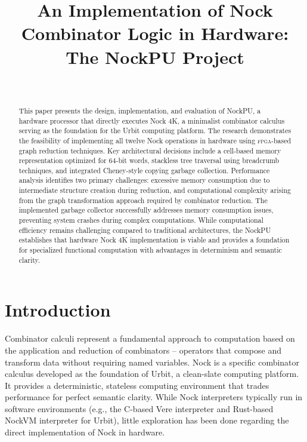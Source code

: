 \documentclass[twoside]{article}
\title{An Implementation of Nock Combinator Logic in Hardware: The NockPU Project}
\author{\authorpatp \\ \affiliation}
\date{}
\begin{document}
\maketitle
\thispagestyle{firststyle}

\begin{abstract}
\sloppy
This paper presents the design, implementation, and evaluation of NockPU, a hardware processor that directly executes Nock 4K, a minimalist combinator calculus serving as the foundation for the Urbit computing platform. The research demonstrates the feasibility of implementing all twelve Nock operations in hardware using \textsc{fpga}-based graph reduction techniques. Key architectural decisions include a cell-based memory representation optimized for 64-bit words, stackless tree traversal using breadcrumb techniques, and integrated Cheney-style copying garbage collection. Performance analysis identifies two primary challenges: excessive memory consumption due to intermediate structure creation during reduction, and computational complexity arising from the graph transformation approach required by combinator reduction. The implemented garbage collector successfully addresses memory consumption issues, preventing system crashes during complex computations. While computational efficiency remains challenging compared to traditional architectures, the NockPU establishes that hardware Nock 4K implementation is viable and provides a foundation for specialized functional computation with advantages in determinism and semantic clarity.
\end{abstract}

\setcounter{page}{99}

\tableofcontents

\section{Introduction}

\sloppy
Combinator calculi represent a fundamental approach to \mbox{computation} based on the application and reduction of combinators -- operators that compose and transform data without requiring named variables. Nock is a specific combinator calculus developed as the foundation of Urbit, a clean-slate computing platform. It provides a deterministic, stateless computing environment that trades performance for perfect semantic clarity. While Nock interpreters typically run in software environments (e.g., the C-based Vere interpreter and Rust-based NockVM interpreter for Urbit), little exploration has been done regarding the direct implementation of Nock in hardware.
\end{document}
